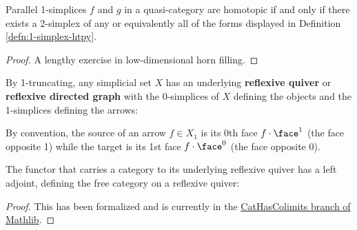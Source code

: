    \begin{lemma}\label{lem:qcat-1-simplex-htpy}
    Parallel 1-sim\-plices $f$ and $g$ in a quasi-category are homotopic if and only if there exists a 2-simplex of any or equivalently all of the forms displayed in Definition \ref{defn:1-simplex-htpy}.
   \end{lemma}
 \begin{proof}
   A lengthy exercise in low-dimensional horn filling.
   \end{proof}

\begin{definition}\label{defn:one-truncation}
  \leanok
  By 1-truncating, any simplicial set $X$ has an underlying \textbf{reflexive quiver} or \textbf{reflexive directed graph} with the 0-simplices of $X$ defining the objects and the 1-simplices defining the arrows:
  \begin{center}
  \end{center}
  By convention, the source of an arrow $f \in X_1$ is its 0th face $f \cdot \face^1$ (the face opposite 1) while the target is its 1st face $f \cdot \face^0$ (the face opposite 0).
\end{definition}

\begin{proposition}\label{prop:free-refl-quiver}
  \leanok
The functor that carries a category to its underlying reflexive quiver has a left adjoint, defining the free category on a reflexive quiver:
\begin{center}
  \end{center}
\end{proposition}
\begin{proof}
  \leanok
This has been formalized and is currently in the \href{https://github.com/leanprover-community/mathlib4/tree/CatHasColimits}{CatHasColimits branch of Mathlib}.
\end{proof}

